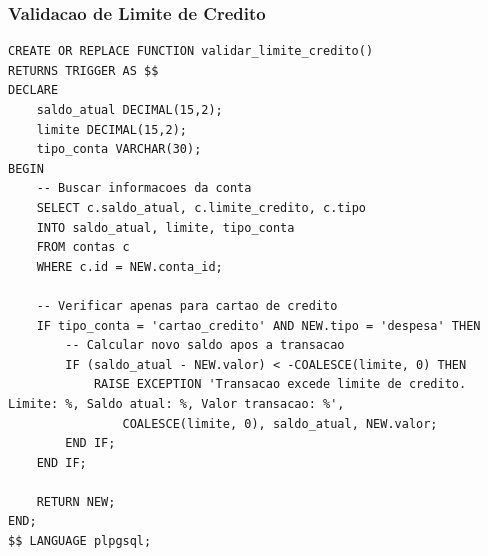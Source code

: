 \subsubsection{Validacao de Limite de Credito}

\begin{lstlisting}[caption=Funcao para validar limite de credito]
CREATE OR REPLACE FUNCTION validar_limite_credito()
RETURNS TRIGGER AS $$
DECLARE
    saldo_atual DECIMAL(15,2);
    limite DECIMAL(15,2);
    tipo_conta VARCHAR(30);
BEGIN
    -- Buscar informacoes da conta
    SELECT c.saldo_atual, c.limite_credito, c.tipo
    INTO saldo_atual, limite, tipo_conta
    FROM contas c
    WHERE c.id = NEW.conta_id;
    
    -- Verificar apenas para cartao de credito
    IF tipo_conta = 'cartao_credito' AND NEW.tipo = 'despesa' THEN
        -- Calcular novo saldo apos a transacao
        IF (saldo_atual - NEW.valor) < -COALESCE(limite, 0) THEN
            RAISE EXCEPTION 'Transacao excede limite de credito. Limite: %, Saldo atual: %, Valor transacao: %',
                COALESCE(limite, 0), saldo_atual, NEW.valor;
        END IF;
    END IF;
    
    RETURN NEW;
END;
$$ LANGUAGE plpgsql;
\end{lstlisting}
